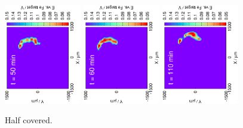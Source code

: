 \documentclass[3p]{elsarticle}
\begin{document}
\begin{figure}[H]
\includegraphics[trim = 20mm 30mm 0mm 20mm, clip, width=0.3\textwidth, angle=-90]{18011715.eps} 
\includegraphics[trim = 20mm 30mm 0mm 20mm, clip, width=0.3\textwidth, angle=-90]{18011716.eps} 
\includegraphics[trim = 20mm 30mm 0mm 20mm, clip, width=0.3\textwidth, angle=-90]{18011719.eps} 
\caption{Half covered.}
\label{fig:deconvolution}
\end{figure}
\end{document}
